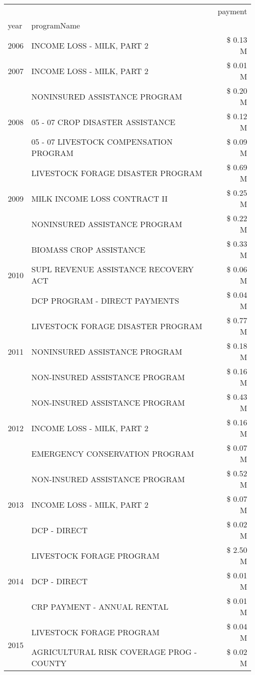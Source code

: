 \begin{tabular}{llr}
\toprule
 &  & payment \\
year & programName &  \\
\midrule
2006 & INCOME LOSS - MILK, PART 2 & \$ 0.13 M \\
\cline{1-3}
2007 & INCOME LOSS - MILK, PART 2 & \$ 0.01 M \\
\cline{1-3}
\multirow[t]{3}{*}{2008} & NONINSURED ASSISTANCE PROGRAM & \$ 0.20 M \\
 & 05 - 07 CROP DISASTER ASSISTANCE & \$ 0.12 M \\
 & 05 - 07 LIVESTOCK COMPENSATION PROGRAM & \$ 0.09 M \\
\cline{1-3}
\multirow[t]{3}{*}{2009} & LIVESTOCK FORAGE DISASTER  PROGRAM & \$ 0.69 M \\
 & MILK INCOME LOSS CONTRACT II & \$ 0.25 M \\
 & NONINSURED ASSISTANCE PROGRAM & \$ 0.22 M \\
\cline{1-3}
\multirow[t]{3}{*}{2010} & BIOMASS CROP ASSISTANCE & \$ 0.33 M \\
 & SUPL REVENUE ASSISTANCE RECOVERY ACT & \$ 0.06 M \\
 & DCP PROGRAM - DIRECT PAYMENTS & \$ 0.04 M \\
\cline{1-3}
\multirow[t]{3}{*}{2011} & LIVESTOCK FORAGE DISASTER PROGRAM & \$ 0.77 M \\
 & NONINSURED ASSISTANCE PROGRAM & \$ 0.18 M \\
 & NON-INSURED ASSISTANCE PROGRAM & \$ 0.16 M \\
\cline{1-3}
\multirow[t]{3}{*}{2012} & NON-INSURED ASSISTANCE PROGRAM & \$ 0.43 M \\
 & INCOME LOSS - MILK, PART 2 & \$ 0.16 M \\
 & EMERGENCY CONSERVATION PROGRAM & \$ 0.07 M \\
\cline{1-3}
\multirow[t]{3}{*}{2013} & NON-INSURED ASSISTANCE PROGRAM & \$ 0.52 M \\
 & INCOME LOSS - MILK, PART 2 & \$ 0.07 M \\
 & DCP - DIRECT & \$ 0.02 M \\
\cline{1-3}
\multirow[t]{3}{*}{2014} & LIVESTOCK FORAGE PROGRAM & \$ 2.50 M \\
 & DCP - DIRECT & \$ 0.01 M \\
 & CRP PAYMENT - ANNUAL RENTAL & \$ 0.01 M \\
\cline{1-3}
\multirow[t]{3}{*}{2015} & LIVESTOCK FORAGE PROGRAM & \$ 0.04 M \\
 & AGRICULTURAL RISK COVERAGE PROG - COUNTY & \$ 0.02 M \\

\end{tabular}
